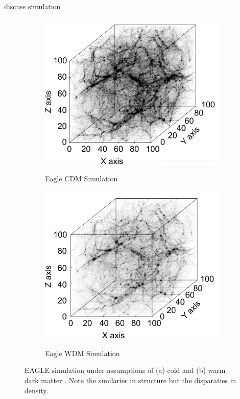 \documentclass[12pt]{article}
\begin{document}
{\color{red} discuss simulation}
\begin{figure}[htp!]
  \centering
  \begin{subfigure}{.49\textwidth}
    \centering
    \caption{Eagle CDM Simulation}  \includegraphics[width=\linewidth]{wdmfig.pdf}
    \label{fig:introDataCDM}
  \end{subfigure}
    \begin{subfigure}{.49\textwidth}
    \centering
    \caption{Eagle WDM Simulation}  \includegraphics[width=\linewidth]{cdmfig.pdf}
    \label{fig:introDataWDM}
  \end{subfigure}
    \caption{EAGLE simulation under assumptions of (a) cold and (b) warm dark matter \cite{schaye2015eagle}. Note the similaries in structure but the disparaties in density. } 
    \label{fig:introData}
\end{figure}
\end{document}

